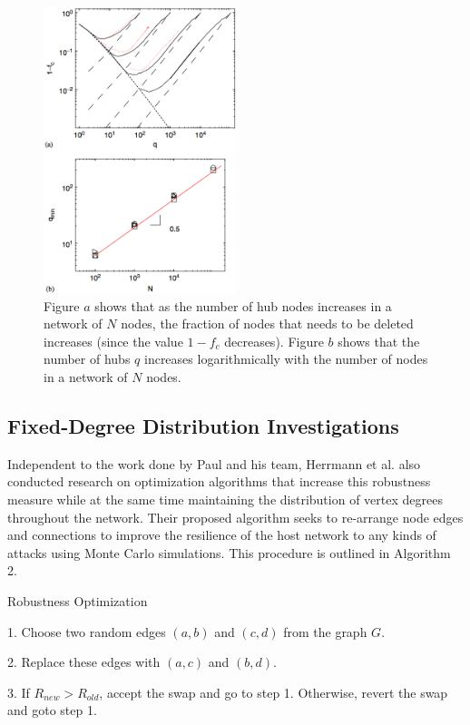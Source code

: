 \documentclass[doc]{apa}%
\begin{document}
\begin{figure}[h!]
	\label{fractionalResults}
	\centering
		\includegraphics[width=0.5\textwidth]{fractional_results.png}
	\caption{Figure $a$ shows that as the number of hub nodes increases in a network of $N$ nodes, the fraction of nodes that needs to be deleted increases (since the value $1 - f_c$ decreases). Figure $b$ shows that the number of hubs $q$ increases logarithmically with the number of nodes in a network of $N$ nodes.}
\end{figure}


\subsection{Fixed-Degree Distribution Investigations}

Independent to the work done by Paul and his team, Herrmann et al. also conducted research on optimization algorithms that increase this robustness measure while at the same time maintaining the distribution of vertex degrees throughout the network. Their proposed algorithm seeks to re-arrange node edges and connections to improve the resilience of the host network to any kinds of attacks using Monte Carlo simulations. This procedure is outlined in Algorithm 2.

\begin{algorithm}
\caption{Robustness Optimization}
\label{alg2}
\begin{algorithmic}
	\item 1. Choose two random edges $(a,b)$ and $(c,d)$ from the graph $G$.
	\item 2. Replace these edges with $(a,c)$ and $(b,d)$.
	\item 3. If $R_{new} > R_{old}$, accept the swap and go to step 1. Otherwise, revert the swap and goto step 1. 
\end{algorithmic}
\end{algorithm}
\end{document}

